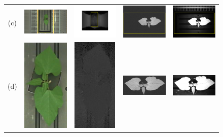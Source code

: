 \begin{figure}
\begin{centering}
\begin{tabular}{@{}c c c c c}
(c) &
\includegraphics[width=.23\textwidth]{Figures/FourModalities/B_rgb}&
\includegraphics[width=.23\textwidth]{Figures/FourModalities/B_depth}&
\includegraphics[width=.23\textwidth]{Figures/FourModalities/B_fmp}&
\includegraphics[width=.23\textwidth]{Figures/FourModalities/B_ir}\\
(d) &
\includegraphics[width=.1\textwidth]{Figures/FourModalities/B1_rgb}&
\includegraphics[width=.1\textwidth]{Figures/FourModalities/B1_depth}&
\includegraphics[width=.2\textwidth]{Figures/FourModalities/B1_fmp}&
\includegraphics[width=.2\textwidth]{Figures/FourModalities/B1_ir}\\

\end{tabular}
\end{centering}
\end{figure}
